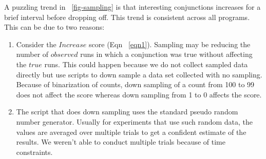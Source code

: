 A puzzling trend in ~\autoref{fig-sampling} is that interesting conjunctions increases for a brief interval before dropping off.  This trend is consistent across all programs.  This can be due to two reasons:
\begin{enumerate}
\item Consider the $Increase$ score (Eqn ~\ref{eqn1}).  Sampling may be reducing the number of $observed$ runs in which a conjunction was true without affecting the $true$ runs.  This could happen because we do not collect sampled data directly but use scripts to down sample a data set collected with no sampling.  Because of binarization of counts, down sampling of a count from 100 to 99 does not affect the score whereas down sampling from 1 to 0 affects the score. 
\item The script that does down sampling uses the standard pseudo random number generator.  Usually for experiments that use such random data, the values are averaged over multiple trials to get a confident estimate of the results.  We weren't able to conduct multiple trials because of time constraints.
\end{enumerate}
